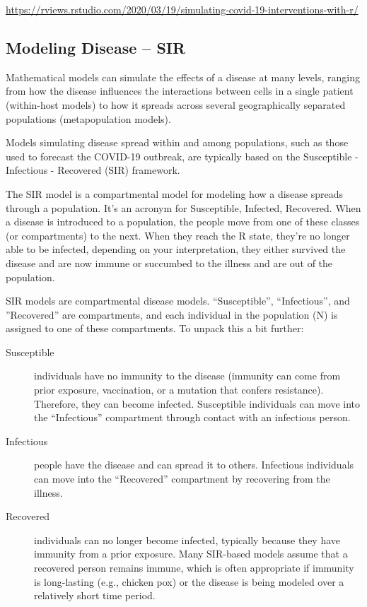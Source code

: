 \documentclass{article}\usepackage[]{graphicx}\usepackage[]{color}
\begin{document}
\url{https://rviews.rstudio.com/2020/03/19/simulating-covid-19-interventions-with-r/}

\subsection{Modeling Disease -- SIR}


Mathematical models can simulate the effects of a disease at many levels, ranging from how the disease influences the interactions between cells in a single patient (within-host models) to how it spreads across several geographically separated populations (metapopulation models). 

Models simulating disease spread within and among populations, such as those used to forecast the COVID-19 outbreak, are typically based on the Susceptible - Infectious - Recovered (SIR) framework.

The SIR model is a compartmental model for modeling how a disease spreads through a population. It's an acronym for Susceptible, Infected, Recovered. When a disease is introduced to a population, the people move from one of these classes (or compartments) to the next. When they reach the R state, they're no longer able to be infected, depending on your interpretation, they either survived the disease and are now immune or succumbed to the illness and are out of the population.



SIR models are compartmental disease models. ``Susceptible'', ``Infectious'', and ''Recovered'' are compartments, and each individual in the population (N) is assigned to one of these compartments. To unpack this a bit further:

\begin{description}
  \item[Susceptible] individuals have no immunity to the disease (immunity can come from prior exposure, vaccination, or a mutation that confers resistance). Therefore, they can become infected. Susceptible individuals can move into the ``Infectious'' compartment through contact with an infectious person.
  \item[Infectious] people have the disease and can spread it to others. Infectious individuals can move into the ``Recovered'' compartment by recovering from the illness.
  \item[Recovered] individuals can no longer become infected, typically because they have immunity from a prior exposure. Many SIR-based models assume that a recovered person remains immune, which is often appropriate if immunity is long-lasting (e.g., chicken pox) or the disease is being modeled over a relatively short time period.
\end{description}
\end{document}
